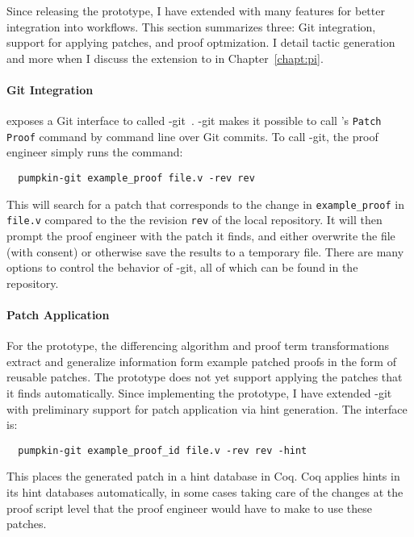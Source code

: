 Since releasing the \sysname prototype, I have extended \sysname with many features
for better integration into  workflows.
This section summarizes three: Git integration, support for applying patches,
and proof optmization.
I detail tactic generation and more when I discuss the \toolnamec extension to \sysnamelong
in Chapter~\ref{chapt:pi}.

\paragraph{Git Integration} \sysnamelong exposes a Git interface to \sysname
called \sysname-git~\cite{pumpkin-git}.
\sysname-git makes it possible to call \sysname's \lstinline{Patch Proof} command by command line over Git commits.
To call \sysname-git, the proof engineer simply runs the command:

\begin{lstlisting}
  pumpkin-git example_proof file.v -rev rev
\end{lstlisting}
This will search for a patch that corresponds to the change in \lstinline{example_proof} in \lstinline{file.v} compared to the the revision \lstinline{rev}
of the local repository. It will then prompt the proof engineer with the patch it finds, and either overwrite the file (with consent) 
or otherwise save the results to a temporary file. There are many options to control the behavior of \sysname-git,
all of which can be found in the repository.

\paragraph{Patch Application}
For the \sysname prototype, the differencing algorithm and proof term transformations extract and generalize information form example patched proofs
in the form of reusable patches. The prototype does not yet support applying the patches that it finds automatically.
Since implementing the prototype, I have extended \sysname-git with preliminary support for patch application via hint generation.
The interface is: %

\begin{lstlisting}
  pumpkin-git example_proof_id file.v -rev rev -hint
\end{lstlisting}
This places the generated patch in a hint database in Coq.
Coq applies hints in its hint databases automatically, in some cases taking care of the changes at the proof script level
that the proof engineer would have to make to use these patches.


